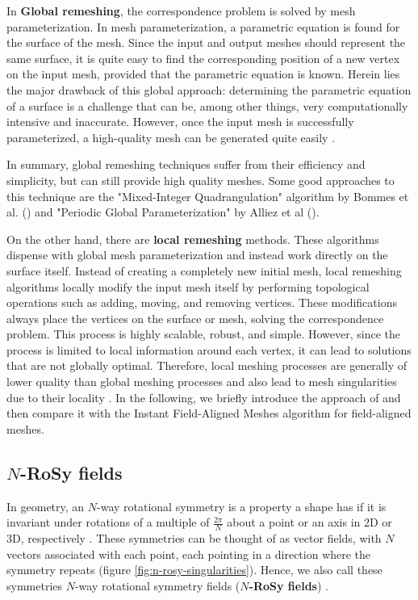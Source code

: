 \documentclass{ACGSeminar}
\begin{document}
In \textbf{Global remeshing}, the correspondence problem is solved by mesh parameterization. In mesh parameterization, a parametric equation is found for the surface of the mesh. Since the input and output meshes should represent the same surface, it is quite easy to find the corresponding position of a new vertex on the input mesh, provided that the parametric equation is known. Herein lies the major drawback of this global approach: determining the parametric equation of a surface is a challenge that can be, among other things, very computationally intensive and inaccurate. However, once the input mesh is successfully parameterized, a high-quality mesh can be generated quite easily \cite{jakob2015instant,alliez2008recent}.

In summary, global remeshing techniques suffer from their efficiency and simplicity, but can still provide high quality meshes. Some good approaches to this technique are the "Mixed-Integer Quadrangulation" algorithm by Bommes et al. (\cite{bommes2009mixed}) and "Periodic Global Parameterization" by Alliez et al (\cite{ray2006periodic}).\bigskip

On the other hand, there are \textbf{local remeshing} methods. These algorithms dispense with global mesh parameterization and instead work directly on the surface itself. Instead of creating a completely new initial mesh, local remeshing algorithms locally modify the input mesh itself by performing topological operations such as adding, moving, and removing vertices. These modifications always place the vertices on the surface or mesh, solving the correspondence problem. This process is highly scalable, robust, and simple. However, since the process is limited to local information around each vertex, it can lead to solutions that are not globally optimal. Therefore, local meshing processes are generally of lower quality than global meshing processes and also lead to mesh singularities due to their locality \cite{jakob2015instant,alliez2008recent}. In the following, we briefly introduce the approach of \cite{tarini2010practical} and then compare it with the Instant Field-Aligned Meshes algorithm for field-aligned meshes.


\subsection{$N$-RoSy fields}\label{rosy}
In geometry, an $N$-way rotational symmetry is a property a shape has if it is invariant under rotations of a multiple of $\frac{2\pi}{N}$ about a point or an axis in 2D or 3D, respectively \cite{palacios2007rotational}. These symmetries can be thought of as vector fields, with $N$ vectors associated with each point, each pointing in a direction where the symmetry repeats (figure \ref{fig:n-rosy-singularities}). Hence, we also call these symmetries $N$-way rotational symmetry fields (\textbf{$N$-RoSy fields}) \cite{panozzo2012fields}.
\end{document}
